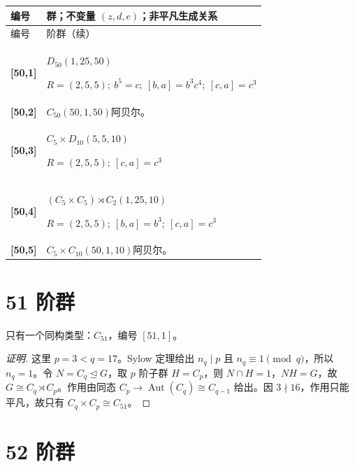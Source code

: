 \documentclass[UTF8,fontset=fandol,11pt,a4paper]{ctexart}
\newcommand{\Aut}{\operatorname{Aut}}\newcommand{\GL}{\operatorname{GL}}\newcommand{\ord}{\operatorname{ord}}\newcommand{\Z}{\mathrm Z}
\begin{document}
\begin{longtable}{@{}p{17mm}>{\raggedright\arraybackslash}p{141mm}@{}}

\toprule 编号 & 群；不变量 $(z,d,e)$；非平凡生成关系\\\midrule\endfirsthead

\toprule 编号 & 50 阶群（续）\\\midrule\endhead\bottomrule\endfoot

\textbf{[50,1]} & $D_{50}$\quad $(1,25,50)$\par\(R=(2,5,5);\allowbreak\ b^{5}=c;\allowbreak\ [b,a]=b^{3}c^{4};\allowbreak\ [c,a]=c^{3}\)\\[3pt]

\textbf{[50,2]} & $C_{50}$\quad $(50,1,50)$\quad 阿贝尔。\\[3pt]

\textbf{[50,3]} & $C_{5}\times D_{10}$\quad $(5,5,10)$\par\(R=(2,5,5);\allowbreak\ [c,a]=c^{3}\)\\[3pt]

\textbf{[50,4]} & $(C_{5}\times C_{5})\rtimes C_{2}$\quad $(1,25,10)$\par\(R=(2,5,5);\allowbreak\ [b,a]=b^{3};\allowbreak\ [c,a]=c^{3}\)\\[3pt]

\textbf{[50,5]} & $C_{5}\times C_{10}$\quad $(50,1,10)$\quad 阿贝尔。\\[3pt]

\end{longtable}\endgroup

\section*{51 阶群}\label{order:51}

只有一个同构类型：$C_{51}$，编号 $[51,1]$。

\begin{proof}[证明]
这里 $p=3<q=17$。Sylow 定理给出 $n_q\mid p$ 且 $n_q\equiv1\pmod q$，所以 $n_q=1$。令 $N=C_q\trianglelefteq G$，取 $p$ 阶子群 $H=C_p$，则 $N\cap H=1$，$NH=G$，故 $G\cong C_q\rtimes C_p$。作用由同态 $C_p\to\Aut(C_q)\cong C_{q-1}$ 给出。因 $3\nmid 16$，作用只能平凡，故只有 $C_q\times C_p\cong C_{51}$。
\end{proof}

\section*{52 阶群}\label{order:52}
\end{document}
